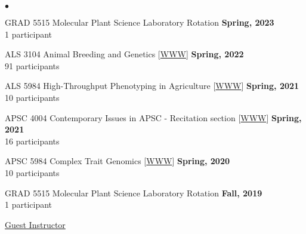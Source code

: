 \documentclass[margin,line,10pt]{res}
\newenvironment{list2}{
  \begin{list}{$\bullet$}{%
      \setlength{\itemsep}{0in}
      \setlength{\parsep}{0in} \setlength{\parskip}{0in}
      \setlength{\topsep}{0in} \setlength{\partopsep}{0in} 
      \setlength{\leftmargin}{0.2in}}}{\end{list}}
\begin{document}
\begin{resume}
\begin{list2}
         \vspace{0.5cm}

  \item GRAD 5515 Molecular Plant Science Laboratory Rotation
  \hfill {\bf Spring, 2023} \\
  1 participant

  \vspace{0.5cm}

   \item ALS 3104 Animal Breeding and Genetics [\textcolor{blue}{\href{http://morotalab.org/als3104-2022/ALS3104.html}{WWW}}] 
  \hfill {\bf Spring, 2022} \\
         91  participants 
  
         \vspace{0.5cm}
         

  \item ALS 5984 High-Throughput Phenotyping in Agriculture [\textcolor{blue}{\href{http://morotalab.org/als5984-2021/ALS5984.html}{WWW}}] 
  \hfill {\bf Spring, 2021} \\
         10  participants 
  
         \vspace{0.5cm}

         
  \item APSC 4004 Contemporary Issues in APSC - Recitation section [\textcolor{blue}{\href{http://morotalab.org/apsc4004-2021/syllabus4004-10730.pdf}{WWW}}] 
  \hfill {\bf Spring, 2021} \\
         16  participants 
  
         \vspace{0.5cm}
         
\item APSC 5984 Complex Trait Genomics [\textcolor{blue}{\href{http://morotalab.org/apsc5984-2020/APSC5984.html}{WWW}}] 
  \hfill {\bf Spring, 2020} \\
         10  participants %
  
     \vspace{0.5cm}

     
\item GRAD 5515 Molecular Plant Science Laboratory Rotation
  \hfill {\bf Fall, 2019} \\
  1 participant

\end{list2}

     \vspace{0.3cm}


\underline{Guest Instructor}




\end{resume}
\end{document}
